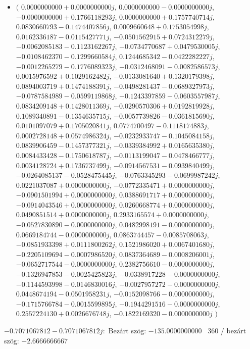 \documentclass[14pt,a4paper]{article}
\begin{document}
\begin{itemize}
\item
$\big($
$0.0000000000+0.0000000000j$, $0.0000000000-0.0000000000j$, $-0.0000000000+0.1766118293j$, $0.0000000000+0.1757740714j$, $0.0830660793-0.1474407856j$, $0.0009660648+0.1753054998j$, $0.0162336187-0.0115427771j$, $-0.0501562915+0.0724312279j$, $-0.0062085183-0.1123162267j$, $-0.0734770687+0.0479530005j$, $-0.0108462370-0.1299660584j$, $0.1244685342-0.0422282227j$, $-0.0012265279-0.1776089323j$, $-0.0312468091-0.0082586573j$, $0.0015976592+0.1029162482j$, $-0.0133081640+0.1320179398j$, $0.0894003719+0.1474188391j$, $-0.0498281437-0.0689327973j$, $-0.0787584989-0.0599119868j$, $-0.1243397859-0.0603557987j$, $0.0834209148+0.1428011369j$, $-0.0290570306+0.0192819928j$, $0.1089340891-0.1354635715j$, $-0.0057739826-0.0361815690j$, $0.0101097079+0.1705020841j$, $0.0774700497-0.1118174883j$, $0.0002728148+0.0574986324j$, $-0.0232933747-0.1045084158j$, $0.0839906459-0.1457377321j$, $-0.0339384992+0.0165635380j$, $0.0084433428-0.1750618787j$, $-0.0113199047-0.0478466777j$, $0.0034128724+0.1736737499j$, $-0.0914567531-0.0939840499j$, $-0.0264085137-0.0528475445j$, $-0.0763345293-0.0699987242j$, $0.0221037087+0.0000000000j$, $-0.0772335471+0.0000000000j$, $-0.0901501994+0.0000000000j$, $0.0388691717+0.0000000000j$, $-0.0914043546+0.0000000000j$, $0.0260668774+0.0000000000j$, $0.0490851514+0.0000000000j$, $0.2933165574+0.0000000000j$, $-0.0527830890-0.0000000000j$, $0.0482998191-0.0000000000j$, $0.0669184744-0.0000000000j$, $0.0863744457-0.0085708063j$, $-0.0851933398+0.0111800262j$, $0.1521986020+0.0067401680j$, $-0.2205109694-0.0007986520j$, $0.0837364689-0.0008206001j$, $-0.0652717544-0.0000000000j$, $0.2382756610-0.0000000000j$, $-0.1326947853-0.0025425823j$, $-0.0338917228-0.0000000000j$, $-0.1144593998-0.0146830016j$, $-0.0027957272-0.0000000000j$, $0.0448674194-0.0501958231j$, $-0.0152098766-0.0000000000j$, $-0.1715766784-0.0015599895j$, $-0.1944291516-0.0000000000j$, $0.2557224130+0.0026676748j$, $-0.1822169320-0.0000000000j$
$\big)$
\end{itemize}
$-0.7071067812-0.7071067812j$:\
Bezárt szög: $-135.0000000000$ \
360 / bezárt szög: $-2.6666666667$\
\end{document}
